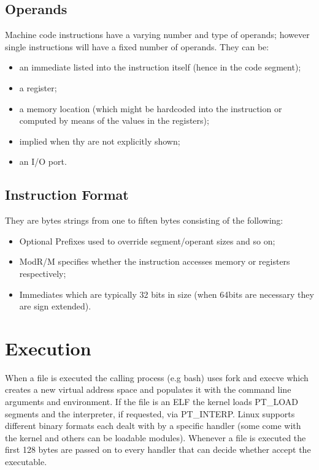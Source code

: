 \subsection{Operands}
Machine code instructions have a varying number and type of operands; however single instructions will have a fixed number of operands. They can be:
\begin{itemize}
    \item an immediate listed into the instruction itself (hence in the code segment);
    \item a register;
    \item a memory location (which might be hardcoded into the instruction or computed by means of the values in the registers);
    \item implied when thy are not explicitly shown;
    \item an I/O port.
\end{itemize}
\subsection{Instruction Format}
They are bytes strings from one to fiften bytes consisting of the following:
\begin{itemize} 
    \item Optional Prefixes used to override segment/operant sizes and so on;
    \item ModR/M specifies whether the instruction accesses memory or registers respectively;
    \item Immediates which are typically 32 bits in size (when 64bits are necessary they are sign extended).
\end{itemize}

\section{Execution}
When a file is executed the calling process (e.g bash) uses {\ttfamily fork} and {\ttfamily execve} which creates a new
virtual address space and populates it with the command line arguments and environment. If the file is an ELF the kernel
loads {\ttfamily PT\_LOAD} segments and the interpreter, if requested, via {\ttfamily PT\_INTERP}. Linux supports
different binary formats each dealt with by a specific handler (some come with the kernel and others can be loadable
modules). Whenever a file is executed the first 128 bytes are passed on to every handler that can decide whether accept
the executable.
